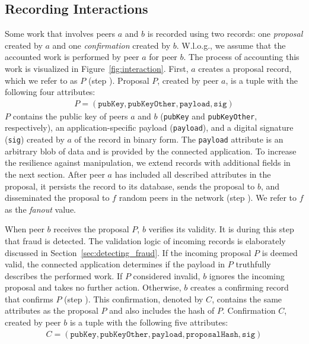 \subsection{Recording Interactions}
\label{sec:recording_interactions}
Some work that involves peers $ a $ and $ b $ is recorded using two records: one \emph{proposal} created by $ a $ and one \emph{confirmation} created by $ b $.
W.l.o.g., we assume that the accounted work is performed by peer $ a $ for peer $ b $.
The process of accounting this work is visualized in Figure~\ref{fig:interaction}.
First, $ a $ creates a proposal record, which we refer to as $ P $ (step ).
Proposal $ P $, created by peer $ a $, is a tuple with the following four attributes:
\begin{align*}
	P = (\texttt{pubKey}, \texttt{pubKeyOther}, \texttt{payload}, \texttt{sig})
\end{align*}
$ P $ contains the public key of peers $ a $ and $ b $ (\texttt{pubKey} and \texttt{pubKeyOther}, respectively), an application-specific payload (\texttt{payload}), and a digital signature (\texttt{sig}) created by $ a $ of the record in binary form.
The \texttt{payload} attribute is an arbitrary blob of data and is provided by the connected application.
To increase the resilience against manipulation, we extend records with additional fields in the next section.
After peer $ a $ has included all described attributes in the proposal, it persists the record to its database, sends the proposal to $ b $, and disseminated the proposal to $ f $ random peers in the network (step ).
We refer to $ f $ as the \emph{fanout} value.

When peer $ b $ receives the proposal $ P $, $ b $ verifies its validity.
It is during this step that fraud is detected.
The validation logic of incoming records is elaborately discussed in Section~\ref{sec:detecting_fraud}.
If the incoming proposal $ P $ is deemed valid, the connected application determines if the payload in $ P $ truthfully describes the performed work.
If $ P $ considered invalid, $ b $ ignores the incoming proposal and takes no further action.
Otherwise, $ b $ creates a confirming record that confirms $ P $ (step ).
This confirmation, denoted by $ C $, contains the same attributes as the proposal $ P $ and also includes the hash of $ P $.
Confirmation $ C $, created by peer $ b $ is a tuple with the following five attributes:
\begin{align*}
	C = (\texttt{pubKey}, \texttt{pubKeyOther}, \texttt{payload}, \texttt{proposalHash}, \texttt{sig})
\end{align*}

